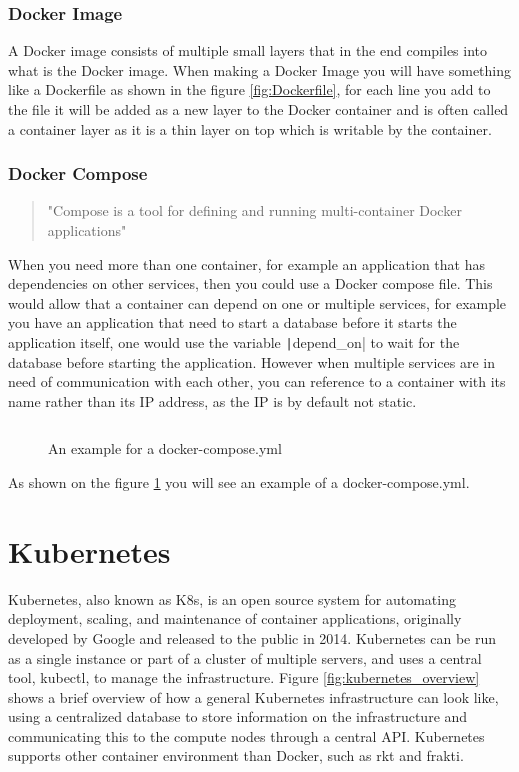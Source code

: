 \documentclass[../main.tex]{subfiles}
\begin{document}
\subsubsection*{Docker Image}
A Docker image\cite{dockerimage} consists of multiple small layers that in the end compiles into what is the Docker image. When making a Docker Image you will have something like a Dockerfile as shown in the figure \ref{fig:Dockerfile}, for each line you add to the file it will be added as a new layer to the Docker container and is often called a container layer as it is a thin layer on top which is writable by the container.%

\subsubsection*{Docker Compose}
\begin{quote}
"Compose is a tool for defining and running multi-container Docker applications" \cite{dockercomp}
\end{quote}

When you need more than one container, for example an application that has dependencies on other services, then you could use a Docker compose file. This would allow that a container can depend on one or multiple services, for example you have an application that need to start a database before it starts the application itself, one would use the variable \texttt|depend_on| to wait for the database before starting the application.
However when multiple services are in need of communication with each other, you can reference to a container with its name rather than its IP address, as the IP is by default not static. \cite{composeNett}

\begin{figure}[H]
    \inputminted[linenos]{octave}{code/docker-compose.yml}
    \caption{An example for a docker-compose.yml}
    \label{fig:docker-compose}
\end{figure}


As shown on the figure \ref{fig:docker-compose} you will see an example of a docker-compose.yml. 


\pagebreak\section{Kubernetes}
Kubernetes, also known as K8s, is an open source system for automating deployment, scaling, and maintenance of container applications, originally developed by Google and released to the public in 2014. \cite{kubernetes_whatis} Kubernetes can be run as a single instance or part of a cluster of multiple servers, and uses a central tool, kubectl, to manage the infrastructure. Figure \ref{fig:kubernetes_overview} shows a brief overview of how a general Kubernetes infrastructure can look like, using a centralized database to store information on the infrastructure and communicating this to the compute nodes through a central API. Kubernetes supports other container environment than Docker, such as rkt and frakti. \cite{kubernetes_cri}
\end{document}
